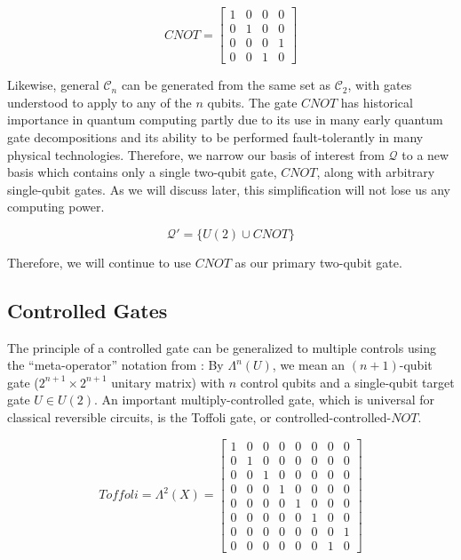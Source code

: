 \begin{displaymath}
CNOT = 
 \left[
  \begin{array}{cccc}
    1 & 0 & 0 & 0 \\
    0 & 1 & 0 & 0 \\
    0 & 0 & 0 & 1 \\
    0 & 0 & 1 & 0
  \end{array} \right]
\end{displaymath}

Likewise, general $\mathcal{C}_n$ can be generated from the same set
as $\mathcal{C}_2$, with gates understood to apply to any of the $n$ qubits.
The gate $CNOT$ has historical importance in quantum computing partly
due to its use in many
early quantum gate decompositions \cite{Barenco1995a} and its ability to
be performed fault-tolerantly in many physical technologies.
Therefore, we narrow our basis of interest from $\mathcal{Q}$ to a new
basis which contains only a single two-qubit gate, $CNOT$, along with
arbitrary single-qubit gates. As we will discuss later, this simplification
will not lose us any computing power.

\begin{equation}
\mathcal{Q}' = \{ U(2) \cup CNOT \}
\end{equation}

Therefore, we will continue to use $CNOT$ as our primary two-qubit gate.

\subsection{Controlled Gates}
\label{subsec:controlled}

The principle of a controlled gate can be generalized to multiple
controls using the ``meta-operator'' notation from \cite{Kitaev2002}:
By $\Lambda^n(U)$, we mean an $(n+1)$-qubit gate ($2^{n+1} \times 2^{n+1}$
unitary matrix) with $n$ control qubits and a single-qubit target gate
$U \in U(2)$. An important multiply-controlled gate, which is universal
for classical reversible circuits, is the Toffoli gate, or controlled-controlled-$NOT$.

\begin{equation}
Toffoli = \Lambda^2(X) = 
 \left[
  \begin{array}{cccccccc}
    1 & 0 & 0 & 0 & 0 & 0 & 0 & 0 \\
    0 & 1 & 0 & 0 & 0 & 0 & 0 & 0 \\
    0 & 0 & 1 & 0 & 0 & 0 & 0 & 0 \\
    0 & 0 & 0 & 1 & 0 & 0 & 0 & 0 \\
    0 & 0 & 0 & 0 & 1 & 0 & 0 & 0 \\
    0 & 0 & 0 & 0 & 0 & 1 & 0 & 0 \\
    0 & 0 & 0 & 0 & 0 & 0 & 0 & 1 \\
    0 & 0 & 0 & 0 & 0 & 0 & 1 & 0
  \end{array} \right]
\end{equation}

